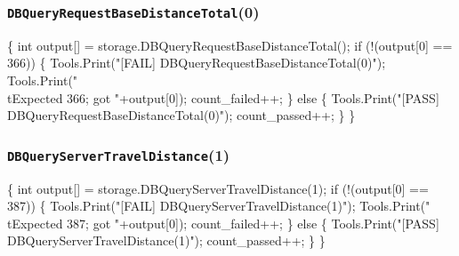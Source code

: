 \documentclass{article}
\def\nwendcode{\endtrivlist \endgroup}
\let\nwdocspar=\par
\begin{document}
\subsubsection{{\tt{}DBQueryRequestBaseDistanceTotal}(0)}
\nwenddocs{}\endmoddef{}
\{
  int output[] = storage.DBQueryRequestBaseDistanceTotal();
  if (!(output[0] == 366)) \{
    Tools.Print("[FAIL] DBQueryRequestBaseDistanceTotal(0)");
    Tools.Print("\\tExpected 366; got "+output[0]);
    count_failed++;
  \} else \{
    Tools.Print("[PASS] DBQueryRequestBaseDistanceTotal(0)");
    count_passed++;
  \}
\}
\nwendcode{}\nwdocspar
\subsubsection{{\tt{}DBQueryServerTravelDistance}(1)}
\nwenddocs{}\endmoddef{}
\{
  int output[] = storage.DBQueryServerTravelDistance(1);
  if (!(output[0] == 387)) \{
    Tools.Print("[FAIL] DBQueryServerTravelDistance(1)");
    Tools.Print("\\tExpected 387; got "+output[0]);
    count_failed++;
  \} else \{
    Tools.Print("[PASS] DBQueryServerTravelDistance(1)");
    count_passed++;
  \}
\}
\nwendcode{}\nwdocspar
\end{document}
